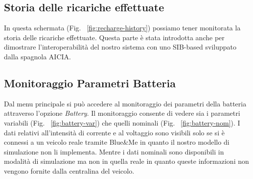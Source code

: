 \subsection{Storia delle ricariche effettuate}

In questa schermata (Fig. ~\ref{fig:recharge-history}) possiamo tener monitorata la storia delle ricariche effettuate. Questa parte è stata introdotta anche per dimostrare l'interoperabilità del nostro sistema con uno SIB-based sviluppato dalla spagnola AICIA.

\subsection{Monitoraggio Parametri Batteria}

Dal menu principale si può accedere al monitoraggio dei parametri della batteria attraverso l'opzione \emph{Battery}. Il monitoraggio consente di vedere sia i parametri variabili (Fig. ~\ref{fig:battery-var}) che quelli nominali (Fig. ~\ref{fig:battery-nom}). I dati relativi all'intensità di corrente e al voltaggio sono visibili solo se si è connessi a un veicolo reale tramite Blue\&{}Me in quanto il nostro modello di simulazione non li implementa. Mentre i dati nominali sono disponibili in modalità di simulazione ma non in quella reale in quanto queste informazioni non vengono fornite dalla centralina del veicolo.

